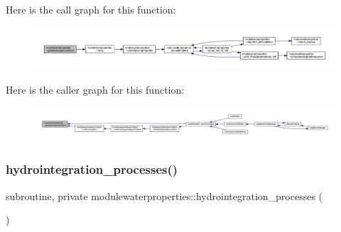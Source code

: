 Here is the call graph for this function\+:\nopagebreak
\begin{figure}[H]
\begin{center}
\leavevmode
\includegraphics[width=350pt]{namespacemodulewaterproperties_afd2b779c6911ab6d6436d6d813a338c7_cgraph}
\end{center}
\end{figure}
Here is the caller graph for this function\+:\nopagebreak
\begin{figure}[H]
\begin{center}
\leavevmode
\includegraphics[width=350pt]{namespacemodulewaterproperties_afd2b779c6911ab6d6436d6d813a338c7_icgraph}
\end{center}
\end{figure}
\mbox{\label{namespacemodulewaterproperties_a9766d3375543a27f75f30630ffe87795}} 
\subsubsection{\texorpdfstring{hydrointegration\+\_\+processes()}{hydrointegration\_processes()}}
{\footnotesize\ttfamily subroutine, private modulewaterproperties\+::hydrointegration\+\_\+processes (\begin{DoxyParamCaption}{ }\end{DoxyParamCaption})\hspace{0.3cm}{\ttfamily [private]}}

